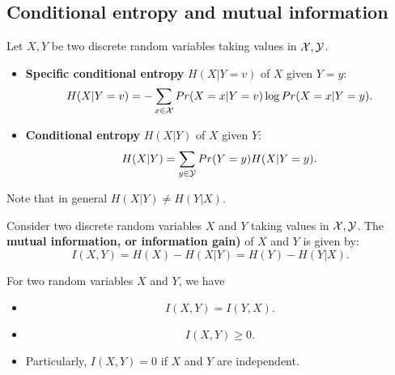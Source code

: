 \begin{refsection}
\subsection{Conditional entropy and mutual information}


\begin{definition}Let $X, Y$ be two discrete random variables taking values in $\mathcal{X}, \mathcal{Y}$. 
	\begin{itemize}
		\item \textbf{Specific conditional entropy} $H(X|Y=v)$ of $X$ given $Y=y$:
		$$H(X|Y=v) = - \sum_{x \in \mathcal{X}} Pr(X=x|Y=v)\log Pr(X=x|Y=y).$$
		\item \textbf{Conditional entropy} $H(X|Y)$ of $X$ given $Y$:
		$$H(X|Y) = \sum_{y\in \mathcal{Y}}Pr(Y = y)H(X|Y = y).$$
	\end{itemize}
Note that in general $H(X | Y) \neq H(Y | X).$
\end{definition}


\begin{definition}\cite{cover2012elements}
	Consider two discrete random variables $X$ and $Y$ taking values in $\mathcal{X}, \mathcal{Y}$. The \textbf{mutual information, or information gain)} of $X$ and $Y$ is given by:
	$$I(X,Y) = H(X) - H(X|Y) = H(Y) - H(Y|X).$$
\end{definition}


\begin{lemma}
For two random variables $X$ and $Y$, we have
\begin{itemize}
	\item $$I(X,Y) = I(Y, X).$$
	\item $$I(X,Y) \geq 0.$$
	\item Particularly,  $I(X,Y) = 0$ if $X$ and $Y$ are independent.
\end{itemize}
\end{lemma}
	
	


\end{refsection}
